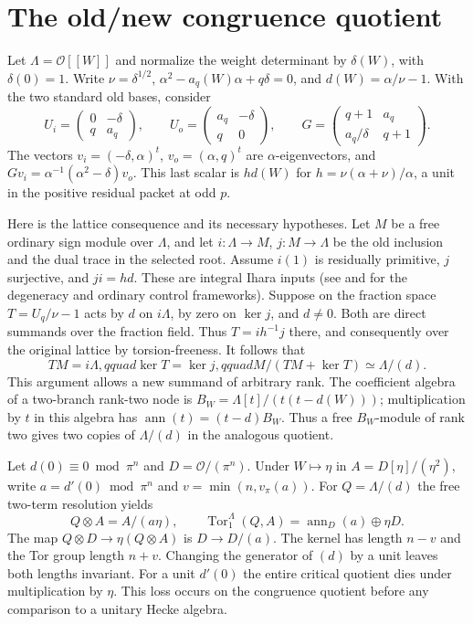 \documentclass[11pt]{article}
\newcommand{\OO}{\mathcal O}
\newcommand{\LambdaW}{\OO[[W]]}
\begin{document}
\section{The old/new congruence quotient}
Let $\Lambda=\LambdaW$ and normalize the weight determinant by
$\delta(W)$, with $\delta(0)=1$. Write $\nu=\delta^{1/2}$,
$\alpha^2-a_q(W)\alpha+q\delta=0$, and $d(W)=\alpha/\nu-1$.
With the two standard old bases, consider
\[
 U_i=\begin{pmatrix}0&-\delta\\q&a_q\end{pmatrix},\qquad
 U_o=\begin{pmatrix}a_q&-\delta\\q&0\end{pmatrix},\qquad
 G=\begin{pmatrix}q+1&a_q\\a_q/\delta&q+1\end{pmatrix}.
\]
The vectors $v_i=(-\delta,\alpha)^t$, $v_o=(\alpha,q)^t$ are
$\alpha$-eigenvectors, and
$Gv_i=\alpha^{-1}(\alpha^2-\delta)v_o$. This last scalar is
$h d(W)$ for $h=\nu(\alpha+\nu)/\alpha$, a unit in the positive
residual packet at odd $p$.

Here is the lattice consequence and its necessary hypotheses.
Let $M$ be a free ordinary sign module over $\Lambda$, and let
$i:\Lambda\to M$, $j:M\to\Lambda$ be the old inclusion and the dual
trace in the selected root. Assume $i(1)$ is residually primitive,
$j$ surjective, and $ji=hd$. These are integral Ihara inputs
(see \cite[\S2.2]{Wiles} and \cite[\S3]{EPW} for the degeneracy and
ordinary control frameworks). Suppose on the fraction space
$T=U_q/\nu-1$ acts by $d$ on $i\Lambda$, by zero on $\ker j$, and
$d\ne0$. Both are direct summands over the fraction field. Thus
$T=i h^{-1}j$ there, and consequently over the original lattice
by torsion-freeness. It follows that
\[
 TM=i\Lambda,qquad \ker T=\ker j,qquad
 M/(TM+\ker T)\simeq\Lambda/(d).
\]
This argument allows a new summand of arbitrary rank. The coefficient
algebra of a two-branch rank-two node is
$B_W=\Lambda[t]/(t(t-d(W)))$; multiplication by $t$ in this algebra
has $\operatorname{ann}(t)=(t-d)B_W$. Thus a free $B_W$-module of
rank two gives two copies of $\Lambda/(d)$ in the analogous quotient.

Let $d(0)\equiv0\bmod\pi^n$ and $D=\OO/(\pi^n)$.
Under $W\mapsto\eta$ in $A=D[\eta]/(\eta^2)$, write $a=d'(0)\bmod\pi^n$
and $v=\min(n,v_\pi(a))$. For $Q=\Lambda/(d)$ the free two-term
resolution yields
\[
 Q\otimes A=A/(a\eta),\qquad
 \operatorname{Tor}^{\Lambda}_1(Q,A)
     =\operatorname{ann}_{D}(a)\oplus\eta D .
\]
The map $Q\otimes D\to\eta(Q\otimes A)$ is $D\to D/(a)$.
The kernel has length $n-v$ and the Tor group length $n+v$.
Changing the generator of $(d)$ by a unit leaves both lengths invariant.
For a unit $d'(0)$ the entire critical quotient dies under multiplication
by $\eta$. This loss occurs on the congruence quotient before any
comparison to a unitary Hecke algebra.
\end{document}
